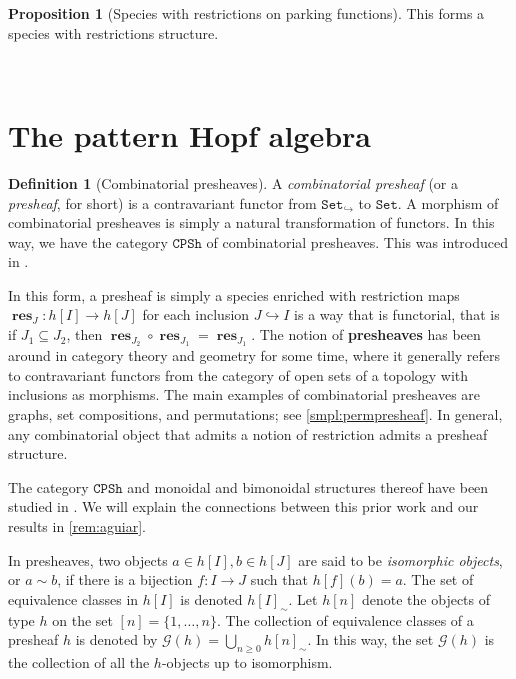\documentclass[12pt, reqno]{amsart}
\theoremstyle{definition}
\newtheorem{prop}[thm]{Proposition}
\newtheorem{defin}[thm]{Definition}
\DeclareMathOperator{\rest}{\mathbf{res}}
\begin{document}
\begin{prop}[Species with restrictions on parking functions]
This forms a species with restrictions structure.
\end{prop}

\



\section{The pattern Hopf algebra \label{sec:pattern_algebra_contruction}}


\begin{defin}[Combinatorial presheaves]
A \textit{combinatorial presheaf} (or a \textit{presheaf}, for short) is a contravariant functor from $\mathtt{Set}_{\hookrightarrow}$ to $\mathtt{Set}$.
A morphism of combinatorial presheaves is simply a natural transformation of functors.
In this way, we have the category $\mathtt{CPSh}$ of combinatorial presheaves.
This was introduced in \cite[Section 8.7.8.]{aguiar10}.
\end{defin}

In this form, a presheaf is simply a species enriched with restriction maps $\rest_J : h[I] \to h[J] $ for each inclusion $J\hookrightarrow I$ is a way that is functorial, that is if $J_1\subseteq J_2$, then $\rest_{J_2} \circ \rest_{J_1} = \rest_{J_1}$.
The notion of \textbf{presheaves} has been around in category theory and geometry for some time, where it generally refers to contravariant functors from the category of open sets of a topology with inclusions as morphisms.
The main examples of combinatorial presheaves are graphs, set compositions, and permutations; see \cref{smpl:permpresheaf}.
In general, any combinatorial object that admits a notion of restriction admits a presheaf structure.

The category $\mathtt{CPSh}$ and monoidal and bimonoidal structures thereof have been studied in \cite{aguiar10}. 
We will explain the connections between this prior work and our results in \cref{rem:aguiar}.

In presheaves, two objects $a\in h[I], b\in h[J]$ are said to be \textit{isomorphic objects}, or $a\sim b$, if there is a bijection $f:I\to J$ such that $h[f](b)=a$.
The set of equivalence classes in $h[I]$ is denoted $h[I]_{\sim}$.
Let $h[n]$ denote the objects of type $h$ on the set $[n] = \{1, \dots , n\}$.
The collection of equivalence classes of a presheaf $h$ is denoted by $\mathcal{G}(h) = \bigcup_{n\geq 0 } h[n]_{\sim }$.
In this way, the set $\mathcal G(h) $ is the collection of all the $h$-objects up to isomorphism.
\end{document}
